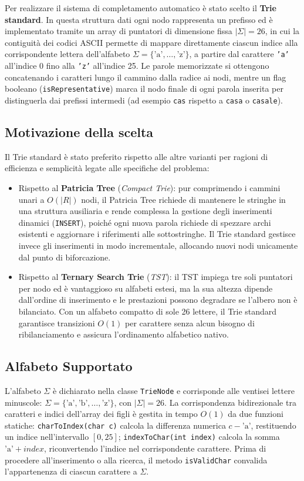 \documentclass[11pt,a4paper]{article}
\begin{document}
Per realizzare il sistema di completamento automatico è stato scelto il \textbf{Trie standard}. In questa struttura dati ogni nodo rappresenta un prefisso ed è implementato tramite un array di puntatori di dimensione fissa $|\Sigma| = 26$, in cui la contiguità dei codici ASCII permette di mappare direttamente ciascun indice alla corrispondente lettera dell'alfabeto $\Sigma = \{\text{'a'}, \dots, \text{'z'}\}$, a partire dal carattere \texttt{'a'} all'indice 0 fino alla \texttt{'z'} all'indice 25.
Le parole memorizzate si ottengono concatenando i caratteri lungo il cammino dalla radice ai nodi, mentre un flag booleano (\texttt{isRepresentative}) marca il nodo finale di ogni parola inserita per distinguerla dai prefissi intermedi (ad esempio \texttt{cas} rispetto a \texttt{casa} o \texttt{casale}).

\subsection{Motivazione della scelta}
Il Trie standard è stato preferito rispetto alle altre varianti per ragioni di efficienza e semplicità legate alle specifiche del problema:
\begin{itemize}
    \item Rispetto al \textbf{Patricia Tree} (\emph{Compact Trie}): pur comprimendo i cammini unari a $O(|R|)$ nodi, il Patricia Tree richiede di mantenere le stringhe in una struttura ausiliaria e rende complessa la gestione degli inserimenti dinamici (\texttt{INSERT}), poiché ogni nuova parola richiede di spezzare archi esistenti e aggiornare i riferimenti alle sottostringhe. Il Trie standard gestisce invece gli inserimenti in modo incrementale, allocando nuovi nodi unicamente dal punto di biforcazione.
    \item Rispetto al \textbf{Ternary Search Trie} (\emph{TST}): il TST impiega tre soli
    puntatori per nodo ed è vantaggioso su alfabeti estesi, ma la sua altezza dipende dall'ordine di inserimento e le prestazioni possono degradare se l'albero non è bilanciato. Con
    un alfabeto compatto di sole 26 lettere, il Trie standard garantisce transizioni $O(1)$ per carattere senza alcun bisogno di ribilanciamento e assicura l'ordinamento alfabetico nativo.
\end{itemize}

\subsection{Alfabeto Supportato}
L'alfabeto $\Sigma$ è dichiarato nella classe \texttt{TrieNode} e corrisponde alle ventisei lettere minuscole: $\Sigma = \{ \text{'a'}, \text{'b'}, \dots, \text{'z'} \}$, con $|\Sigma| = 26$.
La corrispondenza bidirezionale tra caratteri e indici dell'array dei figli è gestita in tempo $O(1)$ da due funzioni statiche:
\texttt{charToIndex(char c)} calcola la differenza numerica $c - \text{'a'}$, restituendo un indice nell'intervallo $[0, 25]$;
\texttt{indexToChar(int index)} calcola la somma $\text{'a'} + index$, riconvertendo l'indice nel corrispondente carattere.
Prima di procedere all'inserimento o alla ricerca, il metodo \texttt{isValidChar} convalida l'appartenenza di ciascun carattere a $\Sigma$.
\end{document}

